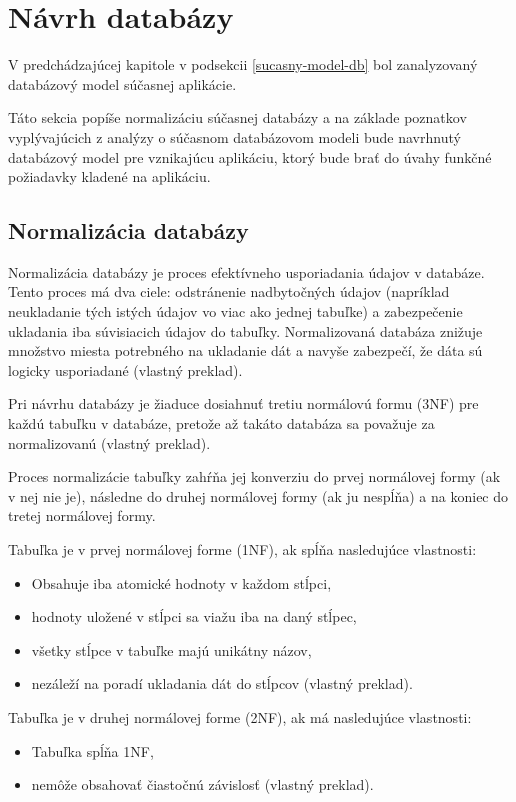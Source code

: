 \section{Návrh databázy}
V predchádzajúcej kapitole v podsekcii \ref{sucasny-model-db} bol zanalyzovaný databázový model súčasnej aplikácie.

Táto sekcia popíše normalizáciu súčasnej databázy a na základe poznatkov vyplývajúcich z analýzy o súčasnom databázovom modeli bude navrhnutý databázový model pre vznikajúcu aplikáciu, ktorý bude brať do úvahy funkčné požiadavky kladené na aplikáciu.

\subsection{Normalizácia databázy}
Normalizácia databázy je proces efektívneho usporiadania údajov v databáze. Tento proces má dva ciele: odstránenie nadbytočných údajov (napríklad neukladanie tých istých údajov vo viac ako jednej tabuľke) a zabezpečenie ukladania iba  súvisiacich údajov do tabuľky. Normalizovaná databáza znižuje množstvo miesta potrebného na ukladanie dát a navyše zabezpečí, že dáta sú logicky usporiadané \cite{co-je-normalizacia} (vlastný preklad).

Pri návrhu databázy je žiaduce dosiahnuť tretiu normálovú formu (3NF) pre každú tabuľku v databáze, pretože až takáto databáza sa považuje za normalizovanú \cite{normalizovana-tabulka} (vlastný preklad).

Proces normalizácie tabuľky zahŕňa jej konverziu do prvej normálovej formy (ak v nej nie je), následne do druhej normálovej formy (ak ju nespĺňa) a na koniec do tretej normálovej formy.

Tabuľka je v prvej normálovej forme (1NF), ak spĺňa nasledujúce vlastnosti:
\begin{itemize}
	\item Obsahuje iba atomické hodnoty v každom stĺpci,
	\item hodnoty uložené v stĺpci sa viažu iba na daný stĺpec,
	\item všetky stĺpce v tabuľke majú unikátny názov,
	\item nezáleží na poradí ukladania dát do stĺpcov \cite{typy-normalizacie} (vlastný preklad). 
\end{itemize}

Tabuľka je v druhej normálovej forme (2NF), ak má nasledujúce vlastnosti:
\begin{itemize}
	\item Tabuľka spĺňa 1NF,
	\item nemôže obsahovať čiastočnú závislosť \cite{typy-normalizacie} (vlastný preklad).
\end{itemize}

